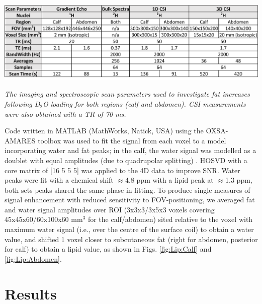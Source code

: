\begin{table}
    \centering
    \includegraphics[width=1\textwidth]{Figures/Lipid/Scan_Details.png}
    \caption{\textit{The imaging and spectroscopic scan parameters used to investigate fat increases following D$_2$O loading for both regions (calf and abdomen). CSI measurements were also obtained with a \ac{TR} of 70 ms.}}
    \label{fig:Lip:Scan_Detail}
\end{table}

Code written in MATLAB (MathWorks, Natick, USA) using the OXSA-AMARES \cite{Purvis2017OXSA:MATLAB} toolbox was used to fit the signal from each voxel to a model incorporating water and fat peaks; in the calf, the water signal was modelled as a doublet with equal amplitudes (due to quadrupolar splitting) \cite{Gursan2022ResidualMuscle}. \ac{HOSVD} \cite{Bader2007EfficientTensors} with a core matrix of [16 5 5 5] was applied to the 4D data to improve \ac{SNR}. Water peaks were fit with a chemical shift $\approx$4.8 ppm with a lipid peak at $\approx$1.3 ppm, both sets peaks shared the same phase in fitting. To produce single measures of signal enhancement with reduced sensitivity to \ac{FOV}-positioning, we averaged fat and water signal amplitudes over \ac{ROI} (3x3x3/3x5x3 voxels covering 45x45x60/60x100x60 mm$^3$ for the calf/abdomen) sited relative to the voxel with maximum water signal (i.e., over the centre of the surface coil) to obtain a water value, and shifted 1 voxel closer to subcutaneous fat (right for abdomen, posterior for calf) to obtain a lipid value, as shown in Figs. \ref{fig:Lip:Calf} and \ref{fig:Lip:Abdomen}.

\section{Results}



